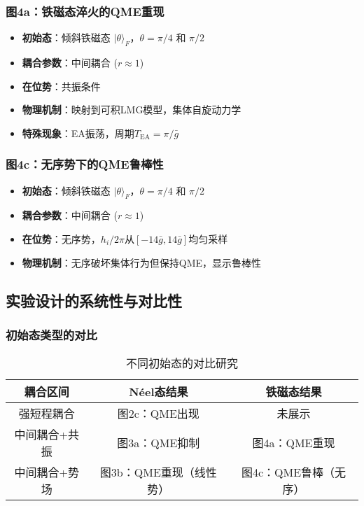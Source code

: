 \documentclass[11pt,a4paper]{article}
\begin{document}
\subsubsection{图4a：铁磁态淬火的QME重现}
\begin{itemize}
    \item \textbf{初始态}：倾斜铁磁态 $|\theta\rangle_F$，$\theta = \pi/4$ 和 $\pi/2$
    \item \textbf{耦合参数}：中间耦合 ($r \approx 1$)
    \item \textbf{在位势}：共振条件
    \item \textbf{物理机制}：映射到可积LMG模型，集体自旋动力学
    \item \textbf{特殊现象}：EA振荡，周期$T_{\text{EA}} = \pi/\bar{g}$
\end{itemize}

\subsubsection{图4c：无序势下的QME鲁棒性}
\begin{itemize}
    \item \textbf{初始态}：倾斜铁磁态 $|\theta\rangle_F$，$\theta = \pi/4$ 和 $\pi/2$
    \item \textbf{耦合参数}：中间耦合 ($r \approx 1$)
    \item \textbf{在位势}：无序势，$h_i/2\pi$从$[-14\bar{g},14\bar{g}]$均匀采样
    \item \textbf{物理机制}：无序破坏集体行为但保持QME，显示鲁棒性
\end{itemize}

\subsection{实验设计的系统性与对比性}

\subsubsection{初始态类型的对比}
\begin{table}[H]
\centering
\caption{不同初始态的对比研究}
\begin{tabular}{|c|c|c|}
\hline
\textbf{耦合区间} & \textbf{Néel态结果} & \textbf{铁磁态结果} \\
\hline
强短程耦合 & 图2c：QME出现 & 未展示 \\
\hline
中间耦合+共振 & 图3a：QME抑制 & 图4a：QME重现 \\
\hline
中间耦合+势场 & 图3b：QME重现（线性势） & 图4c：QME鲁棒（无序） \\
\hline
\end{tabular}
\end{table}
\end{document}
